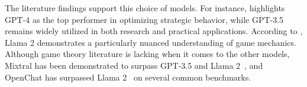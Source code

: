 \documentclass{article}
\begin{document}
The literature findings support this choice of models. For instance, \cite{akata2023playing} highlights GPT-4 as the top performer in optimizing strategic behavior, while GPT-3.5 remains widely utilized in both research and practical applications. According to \cite{lorè2023strategic}, Llama 2 demonstrates a particularly nuanced understanding of game mechanics. Although game theory literature is lacking when it comes to the other models, Mixtral has been demonstrated to surpass GPT-3.5 and Llama 2~\cite{jiang2024mixtral}, and OpenChat has surpassed Llama 2~\cite{wang2023openchat} on several common benchmarks.






\end{document}
